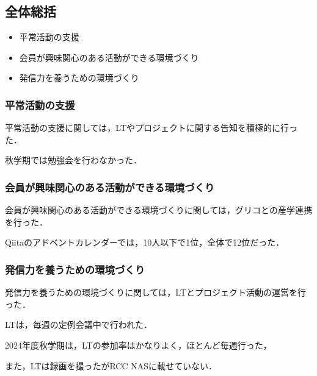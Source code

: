 \subsection{全体総括}


\begin{itemize}
    \item 平常活動の支援
    \item 会員が興味関心のある活動ができる環境づくり
    \item 発信力を養うための環境づくり
\end{itemize}

\subsubsection{平常活動の支援}
平常活動の支援に関しては，LTやプロジェクトに関する告知を積極的に行った．

秋学期では勉強会を行わなかった．　

\subsubsection{会員が興味関心のある活動ができる環境づくり}
会員が興味関心のある活動ができる環境づくりに関しては，グリコとの産学連携を行った．

Qiitaのアドベントカレンダーでは，10人以下で1位，全体で12位だった．


\subsubsection{発信力を養うための環境づくり}
発信力を養うための環境づくりに関しては，LTとプロジェクト活動の運営を行った．

LTは，毎週の定例会議中で行われた．

2024年度秋学期は，LTの参加率はかなりよく，ほとんど毎週行った，

また，LTは録画を撮ったがRCC NASに載せていない．
